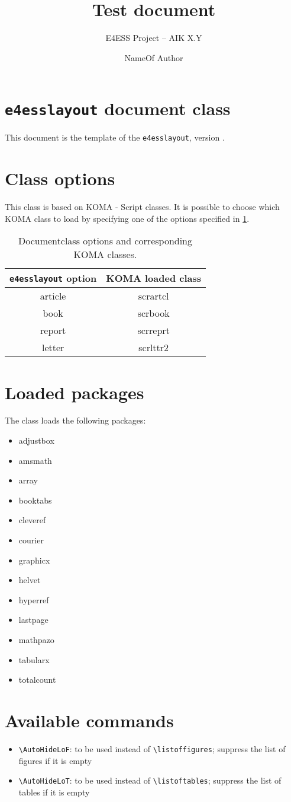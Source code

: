 \documentclass[a4paper,article]{e4esslayout}
\title{%
	Test document
}
\subtitle{%
	E4ESS Project -- AIK X.Y
}
\author{%
	NameOf Author
}
\begin{document}



\section{\texttt{e4esslayout} document class}
\label{sec:declaration}
This document is the template of the \texttt{e4esslayout}, version .

\section{Class options}
\label{sec:cla-opt}
This class is based on \textsf{KOMA - Script} classes.
It is possible to choose which \textsf{KOMA} class to load by specifying one of the options specified in \cref{tab:doc-opt}.
\begin{table}[b]
	\centering
	\caption{Documentclass options and corresponding \textsf{KOMA} classes.}
	\label{tab:doc-opt}
	\begin{tabular}{cc}
	\toprule
	\texttt{e4esslayout} option & \textsf{KOMA} loaded class \\
	\toprule
	article & scrartcl \\
	book    & scrbook \\
	report  & scrreprt \\
	letter  & scrlttr2 \\
	\bottomrule
	\end{tabular}
\end{table}

\section{Loaded packages}
\label{sec:loa-pac}
The class loads the following packages:
\begin{itemize}
	\item adjustbox
	\item amsmath
	\item array
	\item booktabs
	\item cleveref
	\item courier
	\item graphicx
	\item helvet
	\item hyperref
	\item lastpage
	\item mathpazo
	\item tabularx
	\item totalcount
\end{itemize}

\section{Available commands}
\label{sec:ava-com}
\begin{itemize}
	\item \verb^\AutoHideLoF^: to be used instead of \verb^\listoffigures^; suppress the list of figures if it is empty
	\item \verb^\AutoHideLoT^: to be used instead of \verb^\listoftables^; suppress the list of tables if it is empty
\end{itemize}
\end{document}
